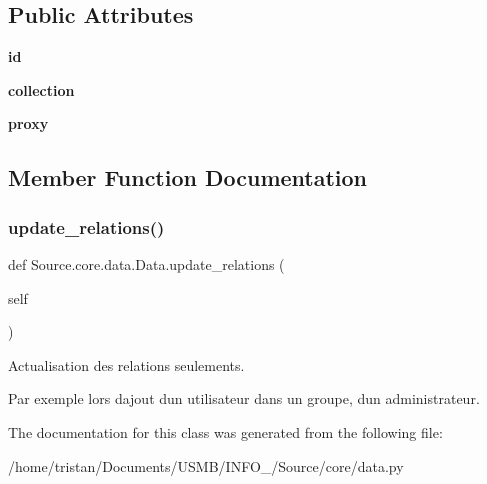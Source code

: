 \subsection*{Public Attributes}
\begin{DoxyCompactItemize}
\item 
\mbox{\label{classSource_1_1core_1_1data_1_1Data_a8cb11df2a94acd2b3c77eb606e80775d}} 
{\bfseries id}
\item 
\mbox{\label{classSource_1_1core_1_1data_1_1Data_a0a9994330613d8f2fceda8175abcd2ce}} 
{\bfseries collection}
\item 
\mbox{\label{classSource_1_1core_1_1data_1_1Data_a2d7bdfd4790514816bffe31175e132f3}} 
{\bfseries proxy}
\end{DoxyCompactItemize}


\subsection{Member Function Documentation}
\mbox{\label{classSource_1_1core_1_1data_1_1Data_a234b982c5580ac03d31f4e8db8ee87a5}} 
\subsubsection{\texorpdfstring{update\+\_\+relations()}{update\_relations()}}
{\footnotesize\ttfamily def Source.\+core.\+data.\+Data.\+update\+\_\+relations (\begin{DoxyParamCaption}\item[{}]{self }\end{DoxyParamCaption})}



Actualisation des relations seulements. 

Par exemple lors d\textquotesingle{}ajout d\textquotesingle{}un utilisateur dans un groupe, d\textquotesingle{}un administrateur. 

The documentation for this class was generated from the following file\+:\begin{DoxyCompactItemize}
\item 
/home/tristan/\+Documents/\+U\+S\+M\+B/\+I\+N\+F\+O\+\_/\+Source/core/data.\+py\end{DoxyCompactItemize}
